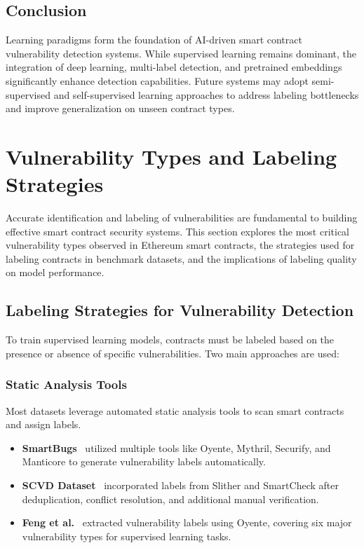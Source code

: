 \subsection*{Conclusion}

Learning paradigms form the foundation of AI-driven smart contract vulnerability detection systems. While supervised learning remains dominant, the integration of deep learning, multi-label detection, and pretrained embeddings significantly enhance detection capabilities. Future systems may adopt semi-supervised and self-supervised learning approaches to address labeling bottlenecks and improve generalization on unseen contract types.

\section{Vulnerability Types and Labeling Strategies}
Accurate identification and labeling of vulnerabilities are fundamental to building effective smart contract security systems. This section explores the most critical vulnerability types observed in Ethereum smart contracts, the strategies used for labeling contracts in benchmark datasets, and the implications of labeling quality on model performance.


\subsection{Labeling Strategies for Vulnerability Detection}
To train supervised learning models, contracts must be labeled based on the presence or absence of specific vulnerabilities. Two main approaches are used:

\subsubsection*{Static Analysis Tools}

Most datasets leverage automated static analysis tools to scan smart contracts and assign labels.

\begin{itemize}
    \item \textbf{SmartBugs}~\cite{durieux2020empirical} utilized multiple tools like Oyente, Mythril, Securify, and Manticore to generate vulnerability labels automatically.
    \item \textbf{SCVD Dataset}~\cite{zhang2020scvd} incorporated labels from Slither and SmartCheck after deduplication, conflict resolution, and additional manual verification.
    \item \textbf{Feng et al.}~\cite{feng2024interpretable} extracted vulnerability labels using Oyente, covering six major vulnerability types for supervised learning tasks.
\end{itemize}

